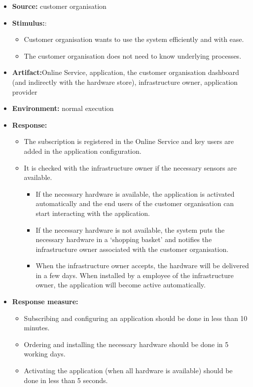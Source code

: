 \begin{itemize}
    \item \textbf{Source:} customer organisation
    \item \textbf{Stimulus:}: 
    \begin{itemize}
    \item Customer organisation wants to use the system efficiently and with ease.
    \item The customer organisation does not need to know underlying processes.
    \end{itemize}
    \item \textbf{Artifact:}Online Service, application, the customer organisation dashboard (and indirectly with the hardware store), infrastructure owner, application provider
    \item \textbf{Environment:} normal execution
    \item \textbf{Response:}
        \begin{itemize}
            \item The subscription is registered in the Online Service and key users are added in the application configuration.
            \item It is checked with the infrastructure owner if the necessary sensors are available.
            \begin{itemize} 
            \item If the necessary hardware is available, the application is activated automatically and the end users of the customer organisation can start interacting with the application.
            \item If the necessary hardware is not available, the system puts the necessary hardware in a `shopping basket' and notifies the infrastructure owner associated with the customer organisation.
            \item When the infrastructure owner accepts, the hardware will be delivered in a few days. When installed by a employee of the infrastructure owner, the application will become active automatically.
            \end{itemize}
        \end{itemize}

    \item \textbf{Response measure:}
        \begin{itemize}
            \item Subscribing and configuring an application should be done in less than 10 minutes.
            \item Ordering and installing the necessary hardware should be done in 5 working days.
            \item Activating the application (when all hardware is available) should be done in less than 5 seconds.
        \end{itemize}
\end{itemize}

